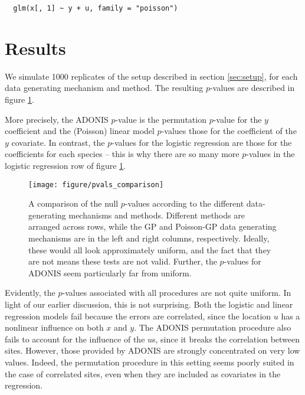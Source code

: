 \documentclass{article}
\newenvironment{code}{\captionsetup{type=listing}}{}
\begin{document}
\begin{code}
\begin{verbatim}
  glm(x[, 1] ~ y + u, family = "poisson")
\end{verbatim}
\label{code:linear_reg}
\end{code}

\section{Results}
\label{sec:results}

We simulate 1000 replicates of the setup described in section \ref{sec:setup},
for each data generating mechanism and method. The resulting $p$-values are
described in figure \ref{fig:pvals_comparison}. 

More precisely, the ADONIS $p$-value is the permutation $p$-value for the $y$
coefficient and the (Poisson) linear model $p$-values those for the coefficient
of the $y$ covariate. In contrast, the $p$-values for the logistic regression
are those for the coefficients for each species -- this is why there are so many
more $p$-values in the logistic regression row of figure
\ref{fig:pvals_comparison}.

\begin{figure}
  \centering
  \texttt{[image: figure/pvals\_comparison]}
  \caption{\label{fig:pvals_comparison} A comparison of the null $p$-values
    according to the different data-generating mechanisms and methods. Different
    methods are arranged across rows, while the GP and Poisson-GP data
    generating mechanisms are in the left and right columns, respectively.
    Ideally, these would all look approximately uniform, and the fact that they
    are not means these tests are not valid. Further, the $p$-values for ADONIS
    seem particularly far from uniform.
  }
\end{figure}

Evidently, the $p$-values associated with all procedures are not quite uniform.
In light of our earlier discussion, this is not surprising. Both the logistic
and linear regression models fail because the errors are correlated, since the
location $u$ has a nonlinear influence on both $x$ and $y$. The ADONIS
permutation procedure also fails to account for the influence of the $u$s, since
it breaks the correlation between sites. However, those provided by ADONIS are
strongly concentrated on very low values. Indeed, the permutation procedure in
this setting seems poorly suited in the case of correlated sites, even when they
are included as covariates in the regression.



\end{document}
